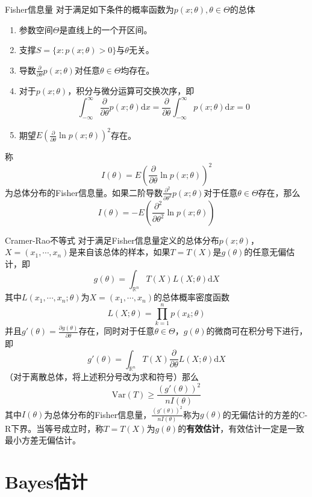 \documentclass[lang = cn, scheme = chinese, thmcnt = section]{elegantbook}
\newcommand{\R}{\mathbb{R}}            %
\begin{document}
\begin{definition}{Fisher信息量}
	对于满足如下条件的概率函数为$p(x;\theta),\theta\in\Theta$的总体
	\begin{enumerate}
		\item 参数空间$\Theta$是直线上的一个开区间。
		\item 支撑$S=\{ x:p(x;\theta)>0 \}$与$\theta$无关。
		\item 导数$\frac{\partial}{\partial \theta}p(x;\theta)$对任意$\theta\in\Theta$均存在。
		\item 对于$p(x;\theta)$，积分与微分运算可交换次序，即
		$$
		\int_{-\infty}^{\infty}{\frac{\partial}{\partial \theta}p(x;\theta)\mathrm{d}x}=
		\frac{\partial}{\partial \theta}\int_{-\infty}^{\infty}{p(x;\theta)\mathrm{d}x}=
		0
		$$
		\item 期望$E\left( \frac{\partial}{\partial \theta}\ln{p(x;\theta)} \right)^2$存在。
	\end{enumerate}
	称
	$$
	I(\theta)=E\left( \frac{\partial}{\partial \theta}\ln{p(x;\theta)} \right)^2
	$$
	为总体分布的Fisher信息量。如果二阶导数$\frac{\partial ^2}{\partial \theta^2}p(x;\theta)$对于任意$\theta\in\Theta$存在，那么
	$$
	I(\theta)=-E\left( \frac{\partial^2}{\partial \theta^2}\ln{p(x;\theta)} \right)
	$$
\end{definition}

\begin{theorem}{Cramer-Rao不等式}
	对于满足Fisher信息量定义的总体分布$p(x;\theta)$，$X=(x_1,\cdots,x_n)$是来自该总体的样本，如果$T=T(X)$是$g(\theta)$的任意无偏估计，即
	$$
	g(\theta)=\int_{\R^n}{T(X)L(X;\theta)\mathrm{d}X}
	$$
	其中$L(x_1,\cdots,x_n;\theta)$为$X=(x_1,\cdots,x_n)$的总体概率密度函数
	$$
	L(X;\theta)=\prod_{k=1}^{n}{p(x_k;\theta)}
	$$
	并且$g'(\theta)=\frac{\partial g(\theta)}{\partial \theta}$存在，同时对于任意$\theta\in\Theta$，$g(\theta)$的微商可在积分号下进行，即
	$$
	g'(\theta)=\int_{\R^n}{T(X)\frac{\partial}{\partial\theta}L(X;\theta)\mathrm{d}X}
	$$
	（对于离散总体，将上述积分号改为求和符号）那么
	$$
	\mathrm{Var}(T)\ge\frac{(g'(\theta))^2}{nI(\theta)}
	$$
	其中$I(\theta)$为总体分布的Fisher信息量，$\frac{(g'(\theta))^2}{nI(\theta)}$称为$g(\theta)$的无偏估计的方差的C-R下界。当等号成立时，称$T=T(X)$为$g(\theta)$的{\bf 有效估计}，有效估计一定是一致最小方差无偏估计。
\end{theorem}

\section{Bayes估计}
\end{document}
